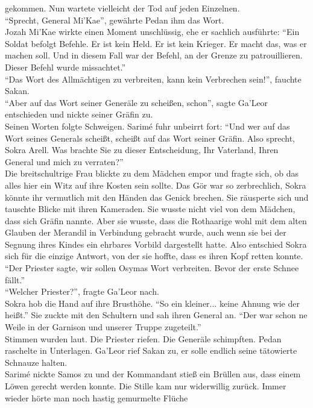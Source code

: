 gekommen. Nun wartete vielleicht der Tod auf jeden Einzelnen.\\
``Sprecht, General Mi'Kae'', gewährte Pedan ihm das Wort.\\
Jozah Mi'Kae wirkte einen Moment unschlüssig, ehe er sachlich ausführte: ``Ein Soldat befolgt 
Befehle. Er ist kein Held. Er ist kein Krieger. Er macht das, was er machen soll. Und in diesem 
Fall war der Befehl, an der Grenze zu patrouillieren. Dieser Befehl wurde missachtet.''\\
``Das Wort des Allmächtigen zu verbreiten, kann kein Verbrechen sein!'', fauchte Sakan.\\
``Aber auf das Wort seiner Generäle zu scheißen, schon'', sagte Ga'Leor entschieden und nickte seiner Gräfin zu.\\
Seinen Worten folgte Schweigen. Sarimé fuhr unbeirrt fort: ``Und wer auf das Wort seines Generals 
scheißt, scheißt auf das Wort seiner Gräfin. Also sprecht, Sokra Arell. Was brachte Sie zu dieser 
Entscheidung, Ihr Vaterland, Ihren General und mich zu verraten?''\\
Die breitschultrige Frau blickte zu dem Mädchen empor und fragte sich, ob das alles hier ein Witz 
auf ihre Kosten sein sollte. Das Gör war so zerbrechlich, Sokra könnte ihr vermutlich mit den 
Händen das Genick brechen. Sie räusperte sich und tauschte Blicke mit ihren Kameraden. Sie wusste 
nicht viel von dem Mädchen, dass sich Gräfin nannte. Aber sie wusste, dass die Rothaarige wohl 
mit dem alten Glauben der Merandil in Verbindung gebracht wurde, auch wenn sie bei der Segnung 
ihres Kindes ein ehrbares Vorbild dargestellt hatte. Also entschied Sokra sich für die einzige 
Antwort, von der sie hoffte, dass es ihren Kopf retten konnte. ``Der Priester sagte, wir sollen 
Osymas Wort verbreiten. Bevor der erste Schnee fällt.''\\
``Welcher Priester?'', fragte Ga'Leor nach.\\
Sokra hob die Hand auf ihre Brusthöhe. ``So ein kleiner... keine Ahnung wie der heißt.'' Sie zuckte 
mit den Schultern und sah ihren General an. ``Der war schon ne Weile in der Garnison und unserer Truppe zugeteilt.''\\
Stimmen wurden laut. Die Priester riefen. Die Generäle schimpften. Pedan raschelte in Unterlagen. 
Ga'Leor rief Sakan zu, er solle endlich seine tätowierte Schnauze halten.\\
Sarimé nickte Samos zu und der Kommandant stieß ein Brüllen aus, dass einem Löwen gerecht werden 
konnte. Die Stille kam nur widerwillig zurück. Immer wieder hörte man noch hastig gemurmelte Flüche 
